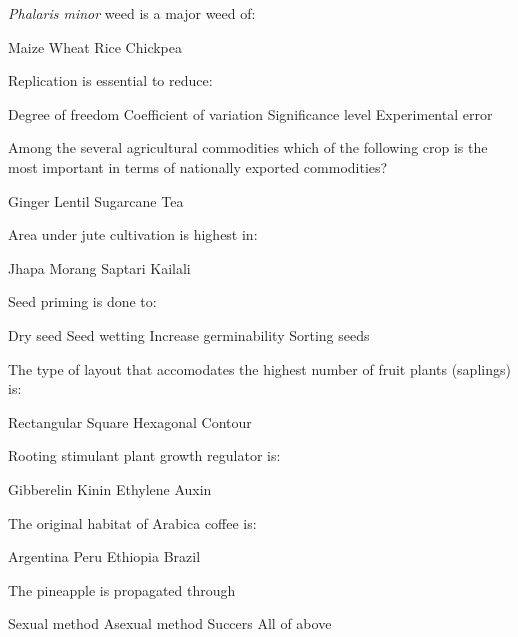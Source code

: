 \begin{questions}
\question \textit{Phalaris minor} weed is a major weed of:
  \begin{choices}
  \choice Maize
  \choice Wheat
  \choice Rice
  \choice Chickpea
  \end{choices}

\question Replication is essential to reduce:
  \begin{choices}
  \choice Degree of freedom
  \choice Coefficient of variation
  \choice Significance level
  \choice Experimental error
  \end{choices}

\question Among the several agricultural commodities which of the following crop is the most important in terms of nationally exported commodities? 
  \begin{choices}
  \choice Ginger
  \choice Lentil
  \choice Sugarcane
  \choice Tea
  \end{choices}

\question Area under jute cultivation is highest in:
  \begin{choices}
  \choice Jhapa
  \choice Morang
  \choice Saptari
  \choice Kailali
  \end{choices}

\question Seed priming is done to:
  \begin{choices}
  \choice Dry seed
  \choice Seed wetting
  \choice Increase germinability
  \choice Sorting seeds
  \end{choices}

\question The type of layout that accomodates the highest number of fruit plants (saplings) is:
  \begin{choices}
  \choice Rectangular
  \choice Square
  \choice Hexagonal
  \choice Contour
  \end{choices}

\question Rooting stimulant plant growth regulator is:
  \begin{choices}
  \choice Gibberelin
  \choice Kinin
  \choice Ethylene
  \choice Auxin
  \end{choices}

\question The original habitat of Arabica coffee is:
  \begin{choices}
  \choice Argentina
  \choice Peru
  \choice Ethiopia
  \choice Brazil
  \end{choices}

\question The pineapple is propagated through \fillin[][3cm]
  \begin{choices}
  \choice Sexual method
  \choice Asexual method
  \choice Succers
  \choice All of above
  \end{choices}


\end{questions}
